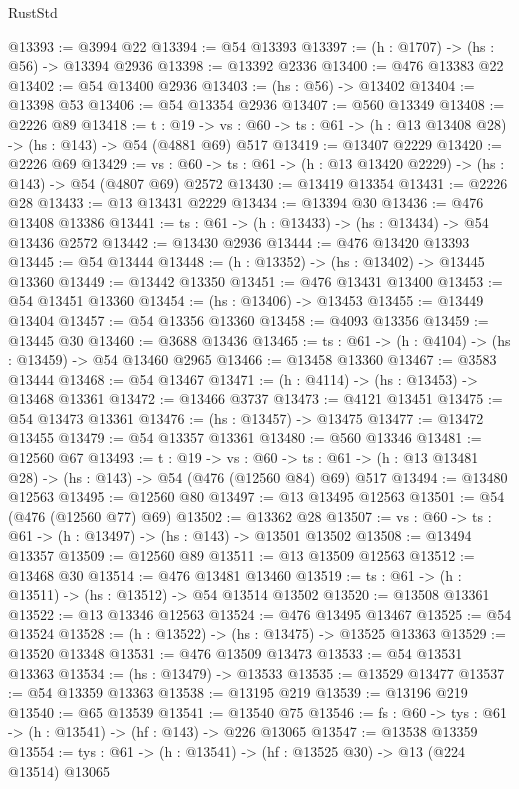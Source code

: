 \begin{lexlean}{RustStd}
\begin{coremodule}
@13393 := @3994 @22
@13394 := @54 @13393
@13397 := (h : @1707) -> (hs : @56) -> @13394 @2936
@13398 := @13392 @2336
@13400 := @476 @13383 @22
@13402 := @54 @13400 @2936
@13403 := (hs : @56) -> @13402
@13404 := @13398 @53
@13406 := @54 @13354 @2936
@13407 := @560 @13349
@13408 := @2226 @89
@13418 := {t : @19} ->
  {vs : @60} -> {ts : @61} -> (h : @13 @13408 @28) -> (hs : @143) -> @54 (@4881 @69) @517
@13419 := @13407 @2229
@13420 := @2226 @69
@13429 := {vs : @60} -> {ts : @61} -> (h : @13 @13420 @2229) -> (hs : @143) -> @54 (@4807 @69) @2572
@13430 := @13419 @13354
@13431 := @2226 @28
@13433 := @13 @13431 @2229
@13434 := @13394 @30
@13436 := @476 @13408 @13386
@13441 := {ts : @61} -> (h : @13433) -> (hs : @13434) -> @54 @13436 @2572
@13442 := @13430 @2936
@13444 := @476 @13420 @13393
@13445 := @54 @13444
@13448 := (h : @13352) -> (hs : @13402) -> @13445 @13360
@13449 := @13442 @13350
@13451 := @476 @13431 @13400
@13453 := @54 @13451 @13360
@13454 := (hs : @13406) -> @13453
@13455 := @13449 @13404
@13457 := @54 @13356 @13360
@13458 := @4093 @13356
@13459 := @13445 @30
@13460 := @3688 @13436
@13465 := {ts : @61} -> (h : @4104) -> (hs : @13459) -> @54 @13460 @2965
@13466 := @13458 @13360
@13467 := @3583 @13444
@13468 := @54 @13467
@13471 := (h : @4114) -> (hs : @13453) -> @13468 @13361
@13472 := @13466 @3737
@13473 := @4121 @13451
@13475 := @54 @13473 @13361
@13476 := (hs : @13457) -> @13475
@13477 := @13472 @13455
@13479 := @54 @13357 @13361
@13480 := @560 @13346
@13481 := @12560 @67
@13493 := {t : @19} ->
  {vs : @60} ->
  {ts : @61} -> (h : @13 @13481 @28) -> (hs : @143) -> @54 (@476 (@12560 @84) @69) @517
@13494 := @13480 @12563
@13495 := @12560 @80
@13497 := @13 @13495 @12563
@13501 := @54 (@476 (@12560 @77) @69)
@13502 := @13362 @28
@13507 := {vs : @60} -> {ts : @61} -> (h : @13497) -> (hs : @143) -> @13501 @13502
@13508 := @13494 @13357
@13509 := @12560 @89
@13511 := @13 @13509 @12563
@13512 := @13468 @30
@13514 := @476 @13481 @13460
@13519 := {ts : @61} -> (h : @13511) -> (hs : @13512) -> @54 @13514 @13502
@13520 := @13508 @13361
@13522 := @13 @13346 @12563
@13524 := @476 @13495 @13467
@13525 := @54 @13524
@13528 := (h : @13522) -> (hs : @13475) -> @13525 @13363
@13529 := @13520 @13348
@13531 := @476 @13509 @13473
@13533 := @54 @13531 @13363
@13534 := (hs : @13479) -> @13533
@13535 := @13529 @13477
@13537 := @54 @13359 @13363
@13538 := @13195 @219
@13539 := @13196 @219
@13540 := @65 @13539
@13541 := @13540 @75
@13546 := {fs : @60} -> {tys : @61} -> (h : @13541) -> (hf : @143) -> @226 @13065
@13547 := @13538 @13359
@13554 := {tys : @61} -> (h : @13541) -> (hf : @13525 @30) -> @13 (@224 @13514) @13065

\end{coremodule}
\end{lexlean}
